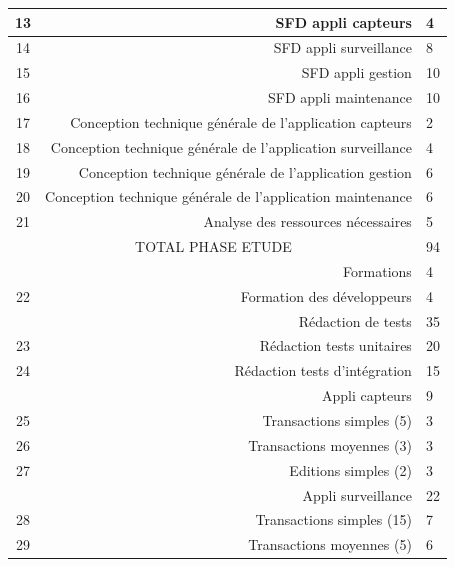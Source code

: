 \documentclass[a4paper]{article}
\begin{document}
\begin{table}[!htp]
\begin{tabular}{|cr|l|}
\cellcolor[HTML]{f9cb9c} 13&SFD appli capteurs &4 \\\hline
\cellcolor[HTML]{f9cb9c} 14&SFD appli surveillance &8 \\\hline
\cellcolor[HTML]{f9cb9c} 15&SFD appli gestion &10 \\\hline
\cellcolor[HTML]{f9cb9c} 16&SFD appli maintenance &10 \\\hline
\cellcolor[HTML]{f9cb9c} 17&Conception technique générale de l’application capteurs &2 \\\hline
\cellcolor[HTML]{f9cb9c} 18&Conception technique générale de l’application surveillance &4 \\\hline
\cellcolor[HTML]{f9cb9c} 19&Conception technique générale de l’application gestion &6 \\\hline
\cellcolor[HTML]{f9cb9c} 20&Conception technique générale de l’application maintenance &6 \\\hline
\cellcolor[HTML]{f9cb9c} 21&Analyse des ressources nécessaires &5 \\\hline
\multicolumn{2}{|c}{\cellcolor[HTML]{d5a6bd}TOTAL PHASE ETUDE} &\cellcolor[HTML]{d5a6bd}94 \\\hline
\cellcolor[HTML]{6aa84f} &\cellcolor[HTML]{93c47d}Formations &\cellcolor[HTML]{93c47d}4 \\\hline
\cellcolor[HTML]{b6d7a8} 22&Formation des développeurs &4 \\\hline
\cellcolor[HTML]{6aa84f} &\cellcolor[HTML]{93c47d}Rédaction de tests &\cellcolor[HTML]{93c47d}35 \\\hline
\cellcolor[HTML]{b6d7a8} 23&Rédaction tests unitaires &20 \\\hline
\cellcolor[HTML]{b6d7a8} 24&Rédaction tests d’intégration &15 \\\hline
\cellcolor[HTML]{6aa84f} &\cellcolor[HTML]{93c47d}Appli capteurs &\cellcolor[HTML]{93c47d}9 \\\hline
\cellcolor[HTML]{b6d7a8} 25&Transactions simples (5) &3 \\\hline
\cellcolor[HTML]{b6d7a8} 26&Transactions moyennes (3) &3 \\\hline
\cellcolor[HTML]{b6d7a8} 27&Editions simples (2) &3 \\\hline
\cellcolor[HTML]{6aa84f} &\cellcolor[HTML]{93c47d}Appli surveillance &\cellcolor[HTML]{93c47d}22 \\\hline
\cellcolor[HTML]{b6d7a8} 28&Transactions simples (15) &7 \\\hline
\cellcolor[HTML]{b6d7a8} 29&Transactions moyennes (5) &6 \\\hline

\end{tabular}
\end{table}
\end{document}
